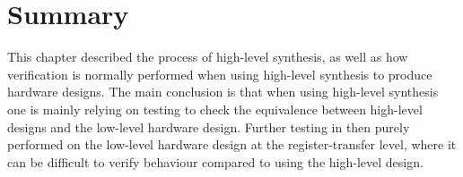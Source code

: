 


%

\section{Summary}%
\label{sec:bg:summary}

This chapter described the process of high-level synthesis, as well as how
verification is normally performed when using high-level synthesis to produce
hardware designs.  The main conclusion is that when using high-level synthesis
one is mainly relying on testing to check the equivalence between high-level
designs and the low-level hardware design.  Further testing in then purely
performed on the low-level hardware design at the register-transfer level, where
it can be difficult to verify behaviour compared to using the high-level design.

